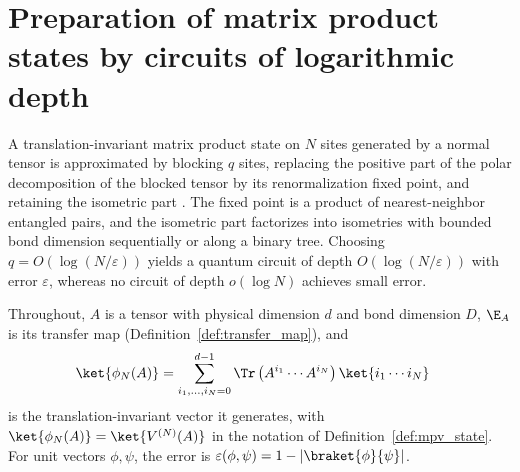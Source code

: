 
\chapter{Preparation of matrix product states by circuits of logarithmic depth}
\label{ch:log_depth_preparation}

A translation-invariant matrix product state on $N$ sites generated by a
normal tensor is approximated by blocking $q$ sites, replacing the positive
part of the polar decomposition of the blocked tensor by its renormalization
fixed point, and retaining the isometric part \cite{Malz2024Preparation}. The fixed point is a product of
nearest-neighbor entangled pairs, and the isometric part factorizes into
isometries with bounded bond dimension sequentially or along a binary
tree. Choosing $q=O(\log(N/\varepsilon))$ yields a quantum circuit of
depth $O(\log(N/\varepsilon))$ with error $\varepsilon$, whereas no circuit of
depth $o(\log N)$ achieves small error.

Throughout, $A$ is a tensor with physical dimension $d$ and bond dimension
$D$, $\E_A$ is its transfer map (Definition~\ref{def:transfer_map}), and
\begin{align}
    \ket{\phi_N(A)}
     & =\sum_{i_1,\dots,i_N=0}^{d-1}\Tr\left(A^{i_1}\cdots A^{i_N}\right)
    \ket{i_1\cdots i_N}
    \label{eq:ldp_ti_mps}
\end{align}
is the translation-invariant vector it generates, with
$\ket{\phi_N(A)}=\ket{V^{(N)}(A)}$ in the notation of
Definition~\ref{def:mpv_state}. For unit vectors $\phi,\psi$, the
error is $\varepsilon(\phi,\psi)=1-\lvert\braket{\phi}{\psi}\rvert$.


